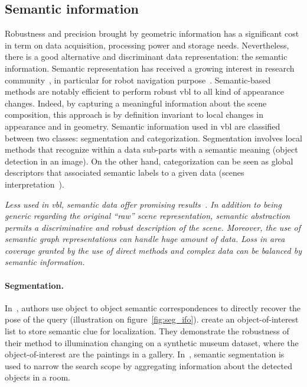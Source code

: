 	\subsection{Semantic information}
		\label{subsec:semantic_info}
		Robustness and precision brought by geometric information has a significant cost in term on data acquisition, processing power and storage needs. Nevertheless, there is a good alternative and discriminant data representation: the semantic information. Semantic representation has received a growing interest in research community~\citep{Liu2016a}, in particular for robot navigation purpose~\citep{Kostavelis2015}. Semantic-based methods are notably efficient to perform robust \ac{vbl} to all kind of appearance changes. Indeed, by capturing a meaningful information about the scene composition, this approach is by definition invariant to local changes in appearance and in geometry. Semantic information used in \ac{vbl} are classified between two classes: segmentation and categorization. Segmentation involves local methods that recognize within a data sub-parts with a semantic meaning (\eg object detection in an image). On the other hand, categorization can be seen as global descriptors that associated semantic labels to a given data (\eg scenes interpretation~\citep{Deng2009}).
		
		\textit{Less used in \ac{vbl}, semantic data offer promising results~\citep{Ardeshir2014,Castaldo2015,Christie2016}. In addition to being generic regarding the original ``raw'' scene representation, semantic abstraction permits a discriminative and robust description of the scene. Moreover, the use of semantic graph representations can handle huge amount of data. Loss in area coverage granted by the use of direct methods and complex data can be balanced by semantic information.}
		
		\paragraph{Segmentation.}
			 In~\citep{Ardeshir2014,Castaldo2015,Christie2016,Weinzaepfel2019}, authors use object to object semantic correspondences to directly recover the pose of the query (illustration on figure~\ref{fig:seg_ifo}). \citet{Weinzaepfel2019} create an object-of-interest list to store semantic clue for localization. They demonstrate the robustness of their method to illumination changing on a synthetic museum dataset, where the object-of-interest are the paintings in a gallery. In~\citep{Lu2015}, semantic segmentation is used to narrow the search scope by aggregating information about the detected objects in a room.

